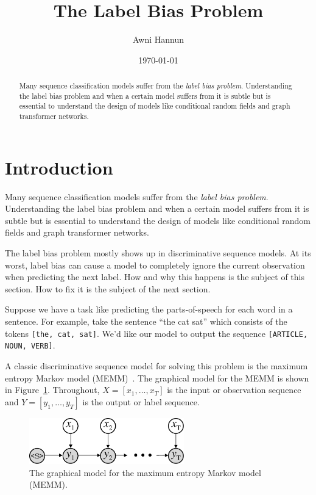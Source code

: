 \documentclass[11pt, letterpaper]{article}
\title{The Label Bias Problem}
\author{Awni Hannun}
\date{\today}
\begin{document}
\maketitle

\begin{abstract}
Many sequence classification models suffer from the \emph{label bias problem}.
Understanding the label bias problem and when a certain model suffers from it
is subtle but is essential to understand the design of models like conditional
random fields and graph transformer networks.
\end{abstract}

\section{Introduction}

Many sequence classification models suffer from the \emph{label bias problem}.
Understanding the label bias problem and when a certain model suffers from it
is subtle but is essential to understand the design of models like conditional
random fields and graph transformer networks.

The label bias problem mostly shows up in discriminative sequence models. At
its worst, label bias can cause a model to completely ignore the current
observation when predicting the next label. How and why this happens is the
subject of this section. How to fix it is the subject of the next section.

Suppose we have a task like predicting the parts-of-speech for each word in a
sentence. For example, take the sentence ``the cat sat'' which consists of
the tokens \texttt{[the, cat, sat]}. We'd like our model to output the sequence
\texttt{[ARTICLE, NOUN, VERB]}.

A classic discriminative sequence model for solving this problem is the maximum
entropy Markov model (MEMM)~\citep{mccallum2000}. The graphical model for the
MEMM is shown in Figure~\ref{fig:memm}. Throughout, $X\!=\![x_1, \ldots, x_T]$
is the input or observation sequence and $Y\!=\![y_1, \ldots, y_T]$ is the
output or label sequence.

\begin{figure}
    \centering
    \includegraphics[width=0.6\textwidth]{figures/memm.pdf}
    \caption{The graphical model for the maximum entropy Markov model (MEMM).}
    \label{fig:memm}
\end{figure}
\end{document}
